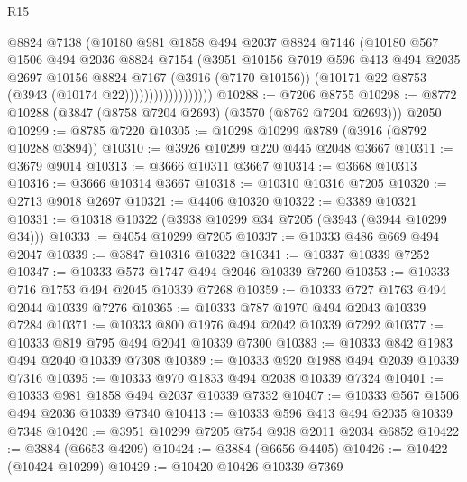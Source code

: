 \begin{lexlean}{R15}
\begin{coremodule}
                            @8824
                            @7138
                            (@10180
                              @981
                              @1858
                              @494
                              @2037
                              @8824
                              @7146
                              (@10180
                                @567
                                @1506
                                @494
                                @2036
                                @8824
                                @7154
                                (@3951
                                  @10156
                                  @7019
                                  @596
                                  @413
                                  @494
                                  @2035
                                  @2697
                                  @10156
                                  @8824
                                  @7167
                                  (@3916 (@7170 @10156))
                                  (@10171 @22 @8753 (@3943 (@10174 @22))))))))))))))))))
@10288 := @7206 @8755
@10298 := @8772 @10288 (@3847 (@8758 @7204 @2693) (@3570 (@8762 @7204 @2693))) @2050
@10299 := @8785 @7220
@10305 := @10298 @10299 @8789 (@3916 (@8792 @10288 @3894))
@10310 := @3926 @10299 @220 @445 @2048 @3667
@10311 := @3679 @9014
@10313 := @3666 @10311 @3667
@10314 := @3668 @10313
@10316 := @3666 @10314 @3667
@10318 := @10310 @10316 @7205
@10320 := @2713 @9018 @2697
@10321 := @4406 @10320
@10322 := @3389 @10321
@10331 := @10318 @10322 (@3938 @10299 @34 @7205 (@3943 (@3944 @10299 @34)))
@10333 := @4054 @10299 @7205
@10337 := @10333 @486 @669 @494 @2047
@10339 := @3847 @10316 @10322
@10341 := @10337 @10339 @7252
@10347 := @10333 @573 @1747 @494 @2046 @10339 @7260
@10353 := @10333 @716 @1753 @494 @2045 @10339 @7268
@10359 := @10333 @727 @1763 @494 @2044 @10339 @7276
@10365 := @10333 @787 @1970 @494 @2043 @10339 @7284
@10371 := @10333 @800 @1976 @494 @2042 @10339 @7292
@10377 := @10333 @819 @795 @494 @2041 @10339 @7300
@10383 := @10333 @842 @1983 @494 @2040 @10339 @7308
@10389 := @10333 @920 @1988 @494 @2039 @10339 @7316
@10395 := @10333 @970 @1833 @494 @2038 @10339 @7324
@10401 := @10333 @981 @1858 @494 @2037 @10339 @7332
@10407 := @10333 @567 @1506 @494 @2036 @10339 @7340
@10413 := @10333 @596 @413 @494 @2035 @10339 @7348
@10420 := @3951 @10299 @7205 @754 @938 @2011 @2034 @6852
@10422 := @3884 (@6653 @4209)
@10424 := @3884 (@6656 @4405)
@10426 := @10422 (@10424 @10299)
@10429 := @10420 @10426 @10339 @7369

\end{coremodule}
\end{lexlean}

